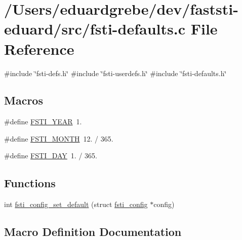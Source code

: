\hypertarget{fsti-defaults_8c}{}\section{/\+Users/eduardgrebe/dev/faststi-\/eduard/src/fsti-\/defaults.c File Reference}
\label{fsti-defaults_8c}
{\ttfamily \#include \char`\"{}fsti-\/defs.\+h\char`\"{}}\newline
{\ttfamily \#include \char`\"{}fsti-\/userdefs.\+h\char`\"{}}\newline
{\ttfamily \#include \char`\"{}fsti-\/defaults.\+h\char`\"{}}\newline
\subsection*{Macros}
\begin{DoxyCompactItemize}
\item 
\#define \mbox{\hyperlink{fsti-defaults_8c_a7aa153bf8abcb37ef62dcbaef21e9394}{F\+S\+T\+I\+\_\+\+Y\+E\+AR}}~1.
\item 
\#define \mbox{\hyperlink{fsti-defaults_8c_a16d7070d4a8d6829f3b7ca5beaf3aa5a}{F\+S\+T\+I\+\_\+\+M\+O\+N\+TH}}~12. / 365.
\item 
\#define \mbox{\hyperlink{fsti-defaults_8c_a0f432da276170c31a022497ecb26c0db}{F\+S\+T\+I\+\_\+\+D\+AY}}~1. / 365.
\end{DoxyCompactItemize}
\subsection*{Functions}
\begin{DoxyCompactItemize}
\item 
int \mbox{\hyperlink{fsti-defaults_8c_ac17ffcd08e1c5eff41d7a65f637c4b06}{fsti\+\_\+config\+\_\+set\+\_\+default}} (struct \mbox{\hyperlink{structfsti__config}{fsti\+\_\+config}} $\ast$config)
\end{DoxyCompactItemize}


\subsection{Macro Definition Documentation}
\mbox{\label{fsti-defaults_8c_a0f432da276170c31a022497ecb26c0db}} 

